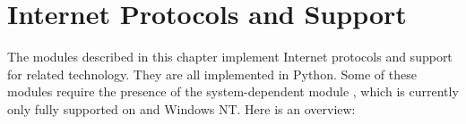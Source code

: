 \chapter{Internet Protocols and Support \label{internet}}


The modules described in this chapter implement Internet protocols and 
support for related technology.  They are all implemented in Python.
Some of these modules require the presence of the system-dependent
module , which is currently only
fully supported on \UNIX{} and Windows NT.  Here is an overview:

\localmoduletable
